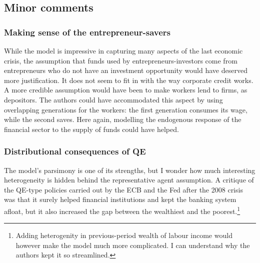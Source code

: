\documentclass{amsart}
\theoremstyle{definition}
\theoremstyle{remark}
\numberwithin{equation}{section}
\begin{document}

\subsection*{Minor comments}

\subsubsection*{Making sense of the entrepreneur-savers} While the model is impressive in capturing many aspects of the last economic crisis, the assumption that funds used by entrepreneurs-investors come from entrepreneurs who do not have an investment opportunity would have deserved more justification. It does not seem to fit in with the way corporate credit works. A more credible assumption would have been to make workers lend to firms, as depositors. The authors could have accommodated this aspect by using overlapping generations for the workers: the first generation consumes its wage, while the second saves. Here again, modelling the endogenous response of the financial sector to the supply of funds could have helped. \\ 

\subsubsection*{Distributional consequences of QE} The model's parsimony is one of its strengths, but I wonder how much interesting heterogeneity is hidden behind the representative agent assumption. A critique of the QE-type policies carried out by the ECB and the Fed after the 2008 crisis was that it surely helped financial institutions and kept the banking system afloat, but it also increased the gap between the wealthiest and the poorest.\footnote{Adding heterogenity in previous-period wealth of labour income would however make the model much more complicated. I can understand why the authors kept it so streamlined.}
\end{document}
